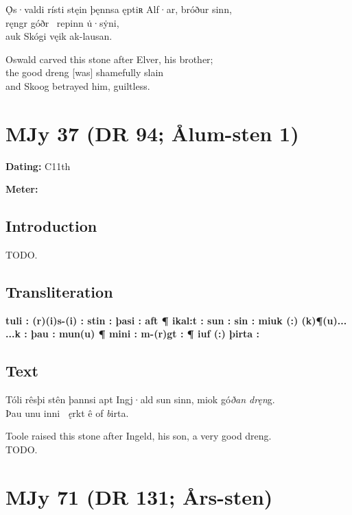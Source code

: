 \bpg\bpa[0]%
\startsub Ǫ̇s·valdi rísti stęin þęnnsa ęptiʀ Alf·ar, bróður sinn,\endsub \\
ręngr góðr \hld\ repinn u̇·sẏni, \\
\ind auk Skógi vęik ak-lausan.\epa

\bpb Oswald carved this stone after Elver, his brother; \\
the good dreng [was] shamefully slain \\
\ind and Skoog betrayed him, guiltless.\epb\epg

\sectionline\newpage


\section{MJy 37 (DR 94; Ålum-sten 1)}

\begin{flushright}%
\textbf{Dating:} C11th

\textbf{Meter:} \Fornyrdislag
\end{flushright}%

\subsection{Introduction}

TODO.

\subsection{Transliteration}

\textbf{tuli : (r)(i)s-(i) : stin : þasi : aft ¶ ikal:t : sun : sin : miuk (:) (k)¶(u)... ...k : þau : mun(u) ¶ mini : m-(r)gt : ¶ iuf (:) þirta :}

\subsection{Text}

\bpg\bpa[0]%
\startsub Tóli rêsþi stên þannsi apt Ingj·ald sun sinn, miok gó\emph{ðan dręn}g.\endsub \\
Þau unu inni \hld\ \emph{ę}rkt ê of \emph{b}irta.\epa

\bpb Toole raised this stone after Ingeld, his son, a very good dreng. \\
TODO.\epb\epg


\sectionline\newpage

\section{MJy 71 (DR 131; Års-sten)}

